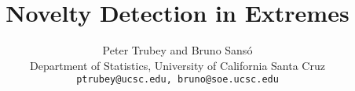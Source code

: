 \documentclass[12pt]{article}
\title{Novelty Detection in Extremes}
\author{Peter Trubey and Bruno Sans\'o\\
Department of Statistics, University of California Santa Cruz\\
{\tt ptrubey@ucsc.edu, bruno@soe.ucsc.edu}}
\begin{document}
\maketitle
\thispagestyle{empty}
\begin{abstract}
  ~%
\end{abstract}


















\end{document}
